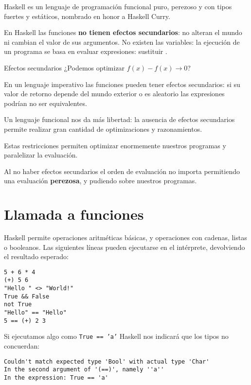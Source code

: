 Haskell es un lenguaje de programación funcional puro, perezoso y con tipos fuertes
y estáticos, nombrado en honor a Haskell Curry.

En Haskell las funciones \textbf{no tienen efectos secundarios}: no alteran el
mundo ni cambian el valor de sus argumentos. No existen las variables: la
ejecución de un programa se basa en evaluar expresiones: sustituir
.

\begin{otro}{Efectos secundarios}
  ¿Podemos optimizar $ f(x) - f(x) \rightarrow 0$?

  \espacio

  En un lenguaje imperativo las funciones pueden tener efectos secundarios:
  si su valor de retorno depende del mundo exterior o es aleatorio las expresiones
  podrían no ser equivalentes.

  \espacio

  Un lenguaje funcional nos da más libertad: la ausencia de efectos secundarios
  permite realizar gran cantidad de optimizaciones y razonamientos.
\end{otro}

Estas restricciones permiten optimizar enormemente nuestros programas y paralelizar
la evaluación.

Al no haber efectos secundarios el orden de evaluación no importa permitiendo una
evaluación \textbf{perezosa}, y pudiendo
 sobre nuestros programas.


\section{Llamada a funciones}

Haskell permite operaciones aritméticas básicas, y operaciones con
cadenas, listas o booleanos. Las siguientes líneas pueden ejecutarse en el
intérprete, devolviendo el resultado esperado:

\begin{lstlisting}
5 + 6 * 4
(+) 5 6
"Hello " <> "World!"
True && False
not True
"Hello" == "Hello"
5 == (+) 2 3
\end{lstlisting}

Si ejecutamos algo como \texttt{True == 'a'} Haskell nos indicará que los tipos
no concuerdan:

\begin{lstlisting}
Couldn't match expected type 'Bool' with actual type 'Char'
In the second argument of '(==)', namely ''a''
In the expression: True == 'a'
\end{lstlisting}

